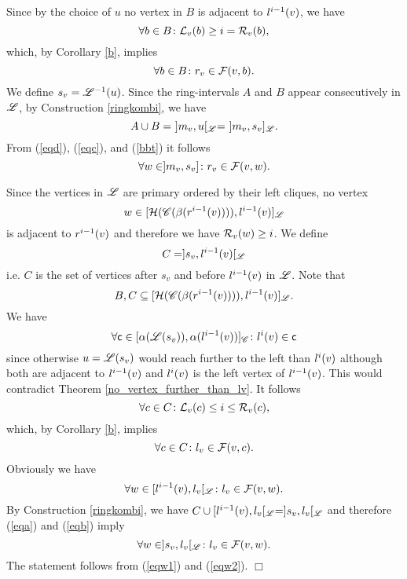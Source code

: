 \documentclass[10pt]{article}
\newenvironment{proof}{\noindent{\bf Proof~}}{\null\hfill $\Box$\par\medskip}
\newcommand{\rvv}{\rv{v}}
\newcommand{\mvv}{\mv{v}}
\newcommand{\svv}{s_v}
\newcommand{\ssref}[1]{(\ref{#1})}
\begin{document}
\begin{proof}
Since by the choice of $u$ no vertex in $B$ is adjacent to $\lvi{v}{i-1}$, we have
$$\forall b\in B\colon\lvd{b}\geq i=\rvd{b},$$
which, by Corollary \ref{b}, implies
\begin{equation}\label{eqc}
\forall b\in B\colon\rvv\in \fe{v}{b}.
\end{equation}
We define $\svv=\ri{L}^{-1}(u)$.
Since the ring-intervals $A$ and $B$ appear consecutively in $\ri{L}$, 
by Construction \ref{ringkombi}, we have
\begin{equation}\label{bbt}
A\cup B=~]\mvv,u[_\ri{L}=~]\mvv,\svv]_\ri{L}.
\end{equation}
From \ssref{eqd}, \ssref{eqc}, and \ssref{bbt} it follows
\begin{equation}\label{eqw1}
\forall w\in]\mvv,\svv]\colon\rv{v}\in \fe{v}{w}.
\end{equation}

Since the vertices in $\ri{L}$ are primary ordered by their left cliques, 
no vertex $$w\in[\first{\ri{C}(\rc{\rvi{v}{i-1}})},\lvi{v}{i-1}]_\ri{L}$$  is adjacent 
to $\rvi{v}{i-1}$ and therefore we have $\rvd{w}\geq i$. We define
$$C=]\svv,\lvi{v}{i-1}[_\ri{L}$$
i.e. $C$ is the set of vertices after $\svv$ and before $\lvi{v}{i-1}$ in $\ri{L}$.
Note that $$B,C\subseteq[\first{\ri{C}(\rc{\rvi{v}{i-1}})},\lvi{v}{i-1}]_\ri{L}.$$
We have
\begin{equation}\label{inca}
\forall \mc{c}\in[\lc{\ri{L}(\svv)},\lc{\lvi{v}{i-1}}]_\ri{C}\colon\lvi{v}{i}\in \mc{c}
\end{equation}
since otherwise $u=\ri{L}(\svv)$ would reach further to the left than $\lvi{v}{i}$ although both are 
adjacent to $\lvi{v}{i-1}$ and $\lvi{v}{i}$ is the left vertex of $\lvi{v}{i-1}$.
This would contradict Theorem \ref{no_vertex_further_than_lv}.
It follows
$$\forall c\in C\colon\lvd{c}\leq i\leq \rvd{c},$$
which, by Corollary \ref{b}, implies 
\begin{equation}\label{eqa}
\forall c\in C\colon\lvv\in \fe{v}{c}.
\end{equation}
Obviously we have 
\begin{equation}\label{eqb}
\forall w\in[\lvi{v}{i-1},\lvv[_\ri{L}\colon\lvv\in \fe{v}{w}.
\end{equation}
By Construction \ref{ringkombi}, we have 
$C\cup[\lvi{v}{i-1},\lvv[_\ri{L}=]\svv,\lvv[_\ri{L}$
and therefore \ssref{eqa} and \ssref{eqb} imply 
\begin{equation}\label{eqw2}
\forall w\in]\svv,\lvv[_\ri{L}\colon \lvv\in \fe{v}{w}.
\end{equation}
The statement follows from \ssref{eqw1} and \ssref{eqw2}.
\end{proof}
\end{document}
